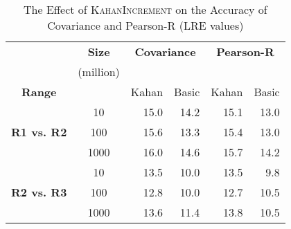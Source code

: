 \begin{table}[t]
\centering
\caption{The Effect of \textsc{KahanIncrement} on the Accuracy of Covariance and Pearson-R (LRE values)}
\label{tab:bivar_vs_hive}
\begin{tabular}{|c|c|r|r|r|r|}
\hline
 & \textbf{Size} & \multicolumn{2}{|c|}{\textbf{Covariance}} &  \multicolumn{2}{|c|}{\textbf{Pearson-R}} \\
 & (million) & \multicolumn{2}{|c|}{} &  \multicolumn{2}{|c|}{} \\
\hline
\textbf{Range} & & Kahan & Basic & Kahan & Basic \\ 
\hline
                     & 10   & 15.0 &  14.2 & 15.1 &  13.0 \\
\textbf{R1 vs. R2}   & 100  & 15.6 &  13.3 & 15.4 &  13.0 \\
                     & 1000 & 16.0 &  14.6 & 15.7 &  14.2 \\
\hline
\hline
                     & 10   & 13.5 &  10.0 & 13.5  & 9.8  \\
\textbf{R2 vs. R3}   & 100  & 12.8 &  10.0 & 12.7 & 10.5 \\
                     & 1000 & 13.6 &  11.4 & 13.8 & 10.5 \\
\hline
\end{tabular}
\end{table}
